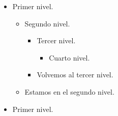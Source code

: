 \documentclass[a4paper,12pt]{article}
\begin{document}
\renewcommand{\labelitemi}{$\clubsuit$}
\begin{itemize}
    \item Primer nivel.
        \begin{itemize}
            \item Segundo nivel.
                \begin{itemize}
                    \item Tercer nivel.
                        \begin{itemize}
                            \item Cuarto nivel.
                        \end{itemize}
                    \item Volvemos al tercer nivel.
                \end{itemize}
            \item Estamos en el segundo nivel.
        \end{itemize}
    \item Primer nivel.
 \end{itemize}
 
\end{document}
